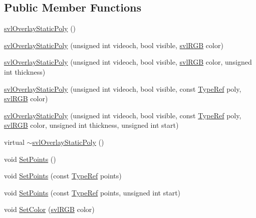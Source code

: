 \subsection*{Public Member Functions}
\begin{DoxyCompactItemize}
\item 
\hyperlink{classsvl_overlay_static_poly_aa13d48357d9b195dcee2decede8df1f4}{svl\+Overlay\+Static\+Poly} ()
\item 
\hyperlink{classsvl_overlay_static_poly_afbb444a8ab7833ad15d5e06fd749af91}{svl\+Overlay\+Static\+Poly} (unsigned int videoch, bool visible, \hyperlink{structsvl_r_g_b}{svl\+R\+G\+B} color)
\item 
\hyperlink{classsvl_overlay_static_poly_a814377b38fbe61886d66e80242767564}{svl\+Overlay\+Static\+Poly} (unsigned int videoch, bool visible, \hyperlink{structsvl_r_g_b}{svl\+R\+G\+B} color, unsigned int thickness)
\item 
\hyperlink{classsvl_overlay_static_poly_abe756bafe2ff6af35dcaa3195efe6908}{svl\+Overlay\+Static\+Poly} (unsigned int videoch, bool visible, const \hyperlink{classsvl_overlay_static_poly_a2d317856c0cec72b3a76252446a85944}{Type\+Ref} poly, \hyperlink{structsvl_r_g_b}{svl\+R\+G\+B} color)
\item 
\hyperlink{classsvl_overlay_static_poly_ad813f1b78670fc599c8e6a40a7574c07}{svl\+Overlay\+Static\+Poly} (unsigned int videoch, bool visible, const \hyperlink{classsvl_overlay_static_poly_a2d317856c0cec72b3a76252446a85944}{Type\+Ref} poly, \hyperlink{structsvl_r_g_b}{svl\+R\+G\+B} color, unsigned int thickness, unsigned int start)
\item 
virtual \hyperlink{classsvl_overlay_static_poly_a8941d61c4367e2f1707b92c5d8040cfb}{$\sim$svl\+Overlay\+Static\+Poly} ()
\item 
void \hyperlink{classsvl_overlay_static_poly_aba2ca2dbf3e0d05cfc178d523b93c7c1}{Set\+Points} ()
\item 
void \hyperlink{classsvl_overlay_static_poly_a7bfbe7094b7ab9f789c4ac08ebd9efef}{Set\+Points} (const \hyperlink{classsvl_overlay_static_poly_a2d317856c0cec72b3a76252446a85944}{Type\+Ref} points)
\item 
void \hyperlink{classsvl_overlay_static_poly_a84671afa45a5523018eab981f70aa60f}{Set\+Points} (const \hyperlink{classsvl_overlay_static_poly_a2d317856c0cec72b3a76252446a85944}{Type\+Ref} points, unsigned int start)
\item 
void \hyperlink{classsvl_overlay_static_poly_abd52aa7bc0015937e7f83c83ad973103}{Set\+Color} (\hyperlink{structsvl_r_g_b}{svl\+R\+G\+B} color)

\end{DoxyCompactItemize}
